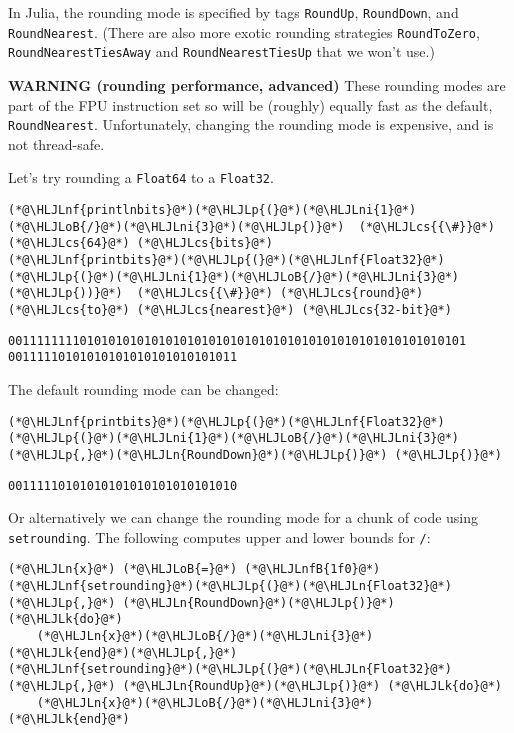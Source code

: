 \documentclass[12pt,a4paper]{article}
\newcommand{\HLJLk}[1]{\textcolor[RGB]{148,91,176}{\textbf{#1}}}
\newcommand{\HLJLn}[1]{#1}
\newcommand{\HLJLnf}[1]{\textcolor[RGB]{66,102,213}{#1}}
\newcommand{\HLJLnfB}[1]{\textcolor[RGB]{59,151,46}{#1}}
\newcommand{\HLJLni}[1]{\textcolor[RGB]{59,151,46}{#1}}
\newcommand{\HLJLoB}[1]{\textcolor[RGB]{102,102,102}{\textbf{#1}}}
\newcommand{\HLJLp}[1]{#1}
\newcommand{\HLJLcs}[1]{\textcolor[RGB]{153,153,119}{\textit{#1}}}
\begin{document}
In Julia, the rounding mode is specified by tags \texttt{RoundUp}, \texttt{RoundDown}, and \texttt{RoundNearest}. (There are also more exotic rounding strategies \texttt{RoundToZero}, \texttt{RoundNearestTiesAway} and \texttt{RoundNearestTiesUp} that we won't use.)

\textbf{WARNING (rounding performance, advanced)} These rounding modes are part of the FPU instruction set so will be (roughly) equally fast as the default, \texttt{RoundNearest}. Unfortunately, changing the rounding mode is expensive, and is not thread-safe.

Let's try rounding a \texttt{Float64} to a \texttt{Float32}.


\begin{lstlisting}
(*@\HLJLnf{printlnbits}@*)(*@\HLJLp{(}@*)(*@\HLJLni{1}@*)(*@\HLJLoB{/}@*)(*@\HLJLni{3}@*)(*@\HLJLp{)}@*)  (*@\HLJLcs{{\#}}@*) (*@\HLJLcs{64}@*) (*@\HLJLcs{bits}@*)
(*@\HLJLnf{printbits}@*)(*@\HLJLp{(}@*)(*@\HLJLnf{Float32}@*)(*@\HLJLp{(}@*)(*@\HLJLni{1}@*)(*@\HLJLoB{/}@*)(*@\HLJLni{3}@*)(*@\HLJLp{))}@*)  (*@\HLJLcs{{\#}}@*) (*@\HLJLcs{round}@*) (*@\HLJLcs{to}@*) (*@\HLJLcs{nearest}@*) (*@\HLJLcs{32-bit}@*)
\end{lstlisting}

\begin{lstlisting}
0011111111010101010101010101010101010101010101010101010101010101
00111110101010101010101010101011
\end{lstlisting}


The default rounding mode can be changed:


\begin{lstlisting}
(*@\HLJLnf{printbits}@*)(*@\HLJLp{(}@*)(*@\HLJLnf{Float32}@*)(*@\HLJLp{(}@*)(*@\HLJLni{1}@*)(*@\HLJLoB{/}@*)(*@\HLJLni{3}@*)(*@\HLJLp{,}@*)(*@\HLJLn{RoundDown}@*)(*@\HLJLp{)}@*) (*@\HLJLp{)}@*)
\end{lstlisting}

\begin{lstlisting}
00111110101010101010101010101010
\end{lstlisting}


Or alternatively we can change the rounding mode for a chunk of code using \texttt{setrounding}. The following computes upper and lower bounds for \texttt{/}:


\begin{lstlisting}
(*@\HLJLn{x}@*) (*@\HLJLoB{=}@*) (*@\HLJLnfB{1f0}@*)
(*@\HLJLnf{setrounding}@*)(*@\HLJLp{(}@*)(*@\HLJLn{Float32}@*)(*@\HLJLp{,}@*) (*@\HLJLn{RoundDown}@*)(*@\HLJLp{)}@*) (*@\HLJLk{do}@*)
    (*@\HLJLn{x}@*)(*@\HLJLoB{/}@*)(*@\HLJLni{3}@*)
(*@\HLJLk{end}@*)(*@\HLJLp{,}@*)
(*@\HLJLnf{setrounding}@*)(*@\HLJLp{(}@*)(*@\HLJLn{Float32}@*)(*@\HLJLp{,}@*) (*@\HLJLn{RoundUp}@*)(*@\HLJLp{)}@*) (*@\HLJLk{do}@*)
    (*@\HLJLn{x}@*)(*@\HLJLoB{/}@*)(*@\HLJLni{3}@*)
(*@\HLJLk{end}@*)
\end{lstlisting}
\end{document}
